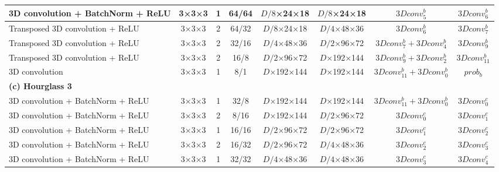 \begin{table}[htbp]
\begin{adjustbox}{width=1\textwidth}
\begin{tabular}{|l|c|c|c|c|c|c|c|}
3D convolution + BatchNorm + ReLU                             & 3×3×3             & 1               & 64/64       & $D/8$×24×18             & $D/8$×24×18            & $3Dconv^b_5$             & $3Dconv^b_6$          \\ \hline
Transposed 3D convolution + ReLU                  & 3×3×3             & 2               & 64/32          & $D/8$×24×18            & $D/4$×48×36            & $3Dconv^b_6$             & $3Dconv^b_7$          \\ \hline
Transposed 3D convolution + ReLU                 & 3×3×3             & 2               & 32/16        & $D/4$×48×36            & $D/2$×96×72           & $3Dconv^b_7+3Dconv^b_4$             & $3Dconv^b_9$         \\ \hline
Transposed 3D convolution + ReLU                 & 3×3×3             & 2               & 16/8        & $D/2$×96×72           & $D$×192×144           & $3Dconv^b_9+3Dconv^b_2$ & $3Dconv^b_11$          \\ \hline
3D convolution                             & 3×3×3             & 1               & 8/1           & $D$×192×144           & $D$×192×144           & $3Dconv^b_11+3Dconv^b_0$             & $prob_b$           \\ \hline
\rowcolor{bgcolor}
\textbf{(c) Hourglass 3} &                 &                 &                 &                 &                 &                    &                 \\ \hline
3D convolution + BatchNorm + ReLU                            & 3×3×3             & 1               & 32/8         & $D$×192×144           & $D$×192×144           & $3Dconv^b_11+3Dconv^b_0$              & $3Dconv^c_0$          \\ \hline
3D convolution + BatchNorm + ReLU                             & 3×3×3             & 2               & 8/16         & $D$×192×144           & $D/2$×96×72           & $3Dconv^c_0$             & $3Dconv^c_1$          \\ \hline
3D convolution + BatchNorm + ReLU                             & 3×3×3             & 1               & 16/16         & $D/2$×96×72           & $D/2$×96×72           & $3Dconv^c_1$             & $3Dconv^c_2$          \\ \hline
3D convolution + BatchNorm + ReLU                             & 3×3×3             & 2               & 16/32         & $D/2$×96×72           & $D/4$×48×36           & $3Dconv^c_2$             & $3Dconv^c_3$          \\ \hline
3D convolution + BatchNorm + ReLU                             & 3×3×3             & 1               & 32/32         & $D/4$×48×36           & $D/4$×48×36            & $3Dconv^c_3$             & $3Dconv^c_4$          \\ \hline

\end{tabular}
\end{adjustbox}
\end{table}
